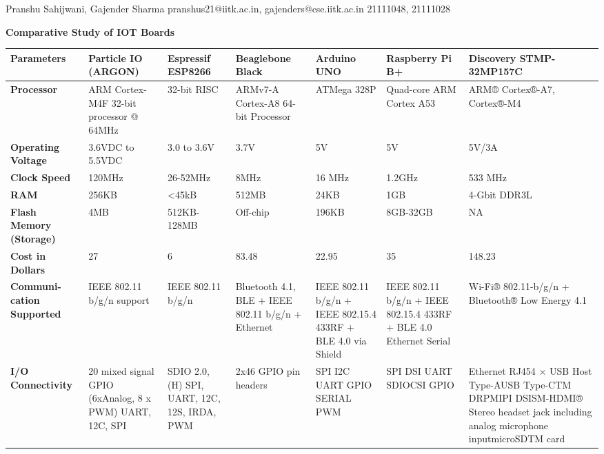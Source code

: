 \documentclass[a4paper,11pt]{article}
\begin{document}
{Pranshu Sahijwani, Gajender Sharma}                    %
{pranshus21@iitk.ac.in, gajenders@cse.iitk.ac.in}      %
{21111048, 21111028}          %


\begin{iotsolution}


\begin{center}
\caption{\textbf{Comparative Study of IOT Boards}} \label{tab:title}
\begin{longtable}{|p{2.2cm}|p{1.5cm}|p{1.5cm}|p{2.2cm}|p{2cm}|p{2cm}|p{2cm}|}

 \hline
 \textbf{Parameters} & Particle IO (ARGON)& Espressif ESP8266 & Beaglebone Black  & Arduino UNO& Raspberry Pi B+ & Discovery STMP-32MP157C \\ [0.5ex]
 \hline\hline
 \textbf{Processor} &
ARM Cortex-M4F 32-bit processor @ 64MHz & 32-bit RISC & ARMv7-A Cortex-A8
64-bit Processor & ATMega 328P & Quad-core ARM Cortex A53 & ARM® Cortex®-A7, Cortex®-M4 \\
 \hline
  \textbf{Operating Voltage} & 3.6VDC to 5.5VDC & 3.0 to 3.6V & 3.7V & 5V & 5V & 5V/3A \\
 \hline
  \textbf{Clock Speed} & 120MHz & 26-52MHz & 8MHz & 16 MHz & 1.2GHz & 533 MHz\\
 \hline
  \textbf{RAM} & 256KB & <45kB & 512MB & 24KB & 1GB & 4-Gbit DDR3L\\
 \hline
   \textbf{Flash Memory (Storage)} & 4MB & 512KB-128MB & Off-chip  & 196KB & 8GB-32GB & NA\\
 \hline
\textbf{Cost in Dollars} & 27 & 6 & 83.48 & 22.95 & 35 & 148.23\\
 \hline

\textbf{Communi-cation Supported} & IEEE 802.11 b/g/n support & IEEE 802.11 b/g/n &Bluetooth 4.1, BLE + IEEE 802.11 b/g/n + Ethernet& IEEE 802.11 b/g/n + IEEE
802.15.4 433RF + BLE 4.0 via
Shield & IEEE 802.11 b/g/n + IEEE 802.15.4
433RF + BLE 4.0 Ethernet Serial & Wi-Fi® 802.11-b/g/n + Bluetooth® Low Energy 4.1\\
 \hline

\textbf{I/O Connectivity} & 20 mixed signal GPIO (6xAnalog, 8 x PWM) UART, 12C, SPI & SDIO 2.0, (H) SPI, UART, 12C, 12S, IRDA, PWM & 2x46 GPIO pin headers &SPI I2C UART GPIO SERIAL PWM& SPI DSI UART SDIOCSI GPIO & Ethernet RJ454 × USB Host Type-AUSB Type-CTM DRPMIPI DSISM-HDMI® Stereo headset jack including analog microphone inputmicroSDTM card\\
 \hline


\end{longtable}
\end{center}
\end{iotsolution}
\end{document}
